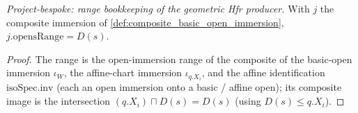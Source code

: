\begin{lemma}
  \label{lem:composite_immersion_range_basicOpen}
  \textit{Project-bespoke: range bookkeeping of the geometric Hfr producer.}
  With \(j\) the composite immersion of \cref{def:composite_basic_open_immersion},
  \(j.\mathrm{opensRange} = D(s)\).
\end{lemma}
\begin{proof}
  The range is the open-immersion range of the composite of the basic-open immersion \(\iota_W\), the
  affine-chart immersion \(\iota_{q.X_i}\), and the affine identification \(\mathrm{isoSpec}.\mathrm{inv}\)
  (each an open immersion onto a basic / affine open); its composite image is the intersection
  \((q.X_i) \sqcap D(s) = D(s)\) (using \(D(s) \le q.X_i\)).
\end{proof}

